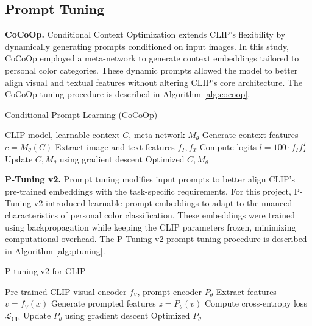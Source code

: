 \documentclass[twocolumn]{article}
\begin{document}
\subsection{Prompt Tuning}
\textbf{CoCoOp.} Conditional Context Optimization extends CLIP's flexibility by dynamically generating prompts conditioned on input images. In this study, CoCoOp employed a meta-network to generate context embeddings tailored to personal color categories. These dynamic prompts allowed the model to better align visual and textual features without altering CLIP's core architecture. The CoCoOp tuning procedure is described in Algorithm \ref{alg:cocoop}.

\begin{algorithm}
\caption{Conditional Prompt Learning (CoCoOp)}
\label{alg:cocoop}
\begin{algorithmic}[1]
\Require CLIP model, learnable context $C$, meta-network $M_\theta$
    \State Generate context features $c = M_\theta(C)$
    \State Extract image and text features $f_I, f_T$
    \State Compute logits $l = 100 \cdot f_I f_T^T$
    \State Update $C, M_\theta$ using gradient descent
\EndFor
\State \Return Optimized $C, M_\theta$
\end{algorithmic}
\end{algorithm}


\textbf{P-Tuning v2.} Prompt tuning modifies input prompts to better align CLIP's pre-trained embeddings with the task-specific requirements. For this project, P-Tuning v2 introduced learnable prompt embeddings to adapt to the nuanced characteristics of personal color classification. These embeddings were trained using backpropagation while keeping the CLIP parameters frozen, minimizing computational overhead. The P-Tuning v2 prompt tuning procedure is described in Algorithm \ref{alg:ptuning}.

\begin{algorithm}
\caption{P-tuning v2 for CLIP}
\label{alg:ptuning}
\begin{algorithmic}[1]
\Require Pre-trained CLIP visual encoder $f_V$, prompt encoder $P_\theta$
    \State Extract features $v = f_V(x)$
    \State Generate prompted features $z = P_\theta(v)$
    \State Compute cross-entropy loss $\mathcal{L}_{\text{CE}}$
    \State Update $P_\theta$ using gradient descent
\EndFor
\State \Return Optimized $P_\theta$
\end{algorithmic}
\end{algorithm}
\end{document}
